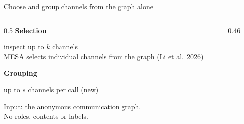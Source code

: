 \documentclass[aspectratio=169,11pt]{beamer}
\begin{document}
\begin{frame}{Choose and group channels from the graph alone}
\begin{columns}[c]
\begin{column}{0.5\textwidth}
\textbf{Selection}\par
inspect up to $k$ channels\\{\color{mute}\small MESA selects individual channels from the graph (Li et al.\ 2026)}
\par\vspace{10pt}
\textbf{Grouping}\par
up to $s$ channels per call {\color{mute}(new)}
\par\vspace{10pt}
{\color{mute}Input: the anonymous communication graph.\\No roles, contents or labels.}
\end{column}
\begin{column}{0.46\textwidth}
\centering
{}
\end{column}
\end{columns}
\end{frame}
\end{document}
